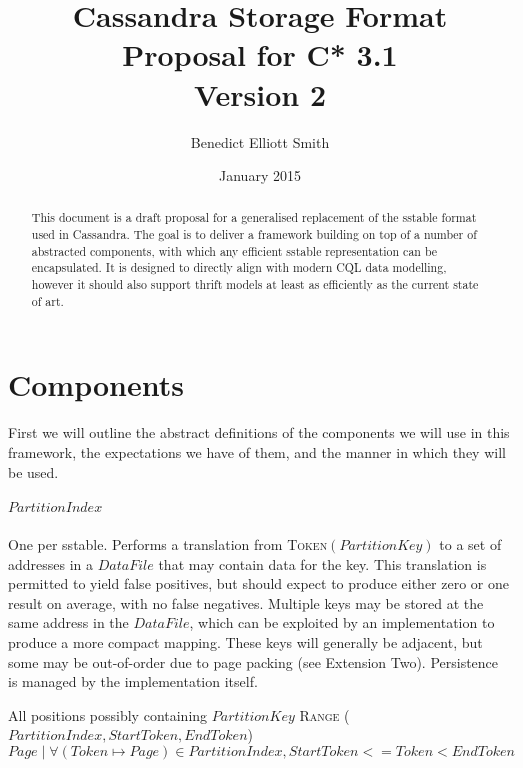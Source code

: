 \documentclass[fleqn]{article}
\title{Cassandra Storage Format\\Proposal for C* 3.1\small\\Version 2}
\author{Benedict Elliott Smith}
\date{January 2015}
\begin{document}
\maketitle

\begin{abstract}
This document is a draft proposal for a generalised replacement of the sstable format used in Cassandra.
The goal is to deliver a framework building on top of a number of abstracted components, with which
any efficient sstable representation can be encapsulated. It is designed to directly align with modern CQL
data modelling, however it should also support thrift models at least as efficiently as the current state of art.
\end{abstract}

\small

\section{Components}
First we will outline the abstract definitions of the components we will use in this framework, the
expectations we have of them, and the manner in which they will be used.
\subparagraph{$PartitionIndex$}
\subparagraph{}
    One per sstable. Performs a translation from \textsc{Token}$(PartitionKey)$ to a set of addresses 
    in a $DataFile$ that may contain data for the key. This translation is permitted to yield false positives, 
    but should expect to produce either zero or one result on average, with no false negatives. Multiple keys 
    may be stored at the same address in the $DataFile$, which can be exploited by an implementation to produce a 
    more compact mapping. These keys will generally be adjacent, but some may be out-of-order due to page 
    packing (see Extension Two). Persistence is managed by the implementation itself.
    \\
    \begin{algorithmic}[2]
    \scriptsize
    \Statex \Return All positions possibly containing $PartitionKey$
    \EndFunction
     \textsc{Range} ({$PartitionIndex, StartToken, EndToken$})
    \Statex \Return ${Page \mid \forall (Token \mapsto Page) \in PartitionIndex, StartToken <= Token < EndToken }$
    \end{algorithmic}
\end{document}
